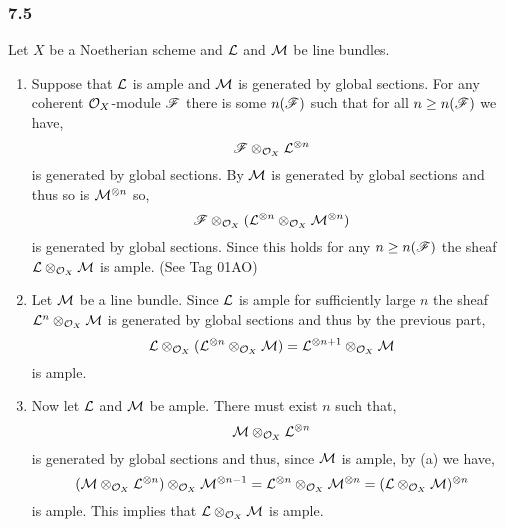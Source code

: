 \documentclass[12pt]{article}
\begin{document}
\subsubsection{7.5}


Let $X$ be a Noetherian scheme and $\mathcal{L}$ and $\mathcal{M}$ be line bundles.

\begin{enumerate}
\item Suppose that $\mathcal{L}$ is ample and $\mathcal{M}$ is generated by global sections. For any coherent $\mathcal{O}_{X}$-module $\mathscr{F}$ there is some $n(\mathscr{F})$ such that for all $n \ge n(\mathscr{F})$ we have,
\[ \mathscr{F} \otimes_{\mathcal{O}_{X}} \mathcal{L}^{\otimes n} \]
is generated by global sections. By $\mathcal{M}$ is generated by global sections and thus so is $\mathcal{M}^{\otimes n}$ so,
\[  \mathscr{F} \otimes_{\mathcal{O}_{X}} (\mathcal{L}^{\otimes n} \otimes_{\mathcal{O}_{X}} \mathcal{M}^{\otimes n}) \]
is generated by global sections. Since this holds for any $n \ge n(\mathscr{F})$ the sheaf $\mathcal{L} \otimes_{\mathcal{O}_{X}} \mathcal{M}$ is ample. (See Tag 01AO)

\item Let $\mathcal{M}$ be a line bundle. Since $\mathcal{L}$ is ample for sufficiently large $n$ the sheaf $\mathcal{L}^n \otimes_{\mathcal{O}_{X}} \mathcal{M}$ is generated by global sections and thus by the previous part,
\[ \mathcal{L} \otimes_{\mathcal{O}_{X}} (\mathcal{L}^{\otimes n} \otimes_{\mathcal{O}_{X}} \mathcal{M}) = \mathcal{L}^{\otimes n+1} \otimes_{\mathcal{O}_{X}} \mathcal{M} \]
is ample.
\item Now let $\mathcal{L}$ and $\mathcal{M}$ be ample. There must exist $n$ such that,
\[ \mathcal{M} \otimes_{\mathcal{O}_{X}} \mathcal{L}^{\otimes n} \]
is generated by global sections and thus, since $\mathcal{M}$ is ample, by (a) we have,
\[ (\mathcal{M} \otimes_{\mathcal{O}_{X}} \mathcal{L}^{\otimes n}) \otimes_{\mathcal{O}_{X}} \mathcal{M}^{\otimes n - 1} =  \mathcal{L}^{\otimes n} \otimes_{\mathcal{O}_{X}} \mathcal{M}^{\otimes n} = (\mathcal{L} \otimes_{\mathcal{O}_{X}} \mathcal{M})^{\otimes n} \]
is ample. This implies that $\mathcal{L} \otimes_{\mathcal{O}_{X}} \mathcal{M}$ is ample. 


\end{enumerate}
\end{document}
